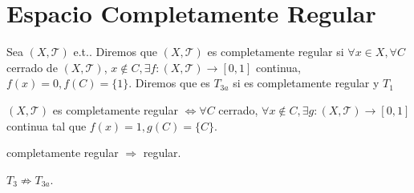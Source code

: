 \section{Espacio Completamente Regular}

 \begin{defn}
   Sea $( X, \mathcal{T} )$ e.t.. Diremos que $( X, \mathcal{T} )$ es completamente regular si $\forall x \in X, \forall C$ cerrado de $( X, \mathcal{T} )$, $x \not \in C, \exists f: ( X, \mathcal{T} ) \to [0,1]$ continua, $f(x) = 0, f(C) = \{ 1 \}$. Diremos que es $T_{3a}$ si es completamente regular y $T_{1}$
 \end{defn}

  \begin{obs}
    $( X, \mathcal{T} )$ es completamente regular $\Leftrightarrow \forall C$ cerrado, $\forall x \not \in C, \exists g: ( X, \mathcal{T} ) \to [0,1]$ continua tal que $ f(x) = 1, g(C) = \{  C \}$.
  \end{obs}

  \begin{obs}
    completamente regular $\Rightarrow$ regular.
  \end{obs}

  \begin{obs}
    $T_{3} \not \Rightarrow T_{3a}$.
  \end{obs}
